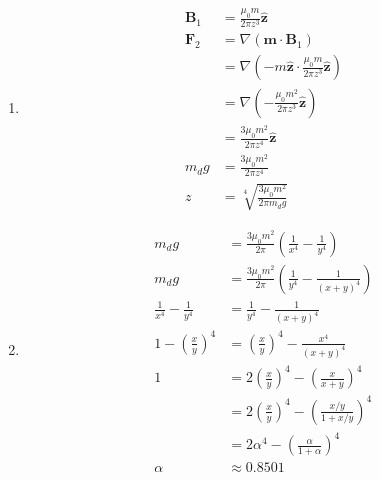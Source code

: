 \documentclass{article}
\renewcommand{\vec}[1]{\boldsymbol{\mathbf{#1}}}
\newcommand{\uvec}[1]{\hat{\vec{#1}}}
\begin{document}
\begin{enumerate}
  \item

        \begin{align*}
          \vec{B}_1 & = \frac{\mu_0 m}{2 \pi z^3} \uvec{z}                                         \\
          \vec{F}_2 & = \nabla (\vec{m} \cdot \vec{B}_1)                                           \\
                    & = \nabla \left( -m \uvec{z} \cdot \frac{\mu_0 m}{2 \pi z^3} \uvec{z} \right) \\
                    & = \nabla \left( -\frac{\mu_0 m^2}{2 \pi z^3} \uvec{z} \right)                \\
                    & = \frac{3 \mu_0 m^2}{2 \pi z^4} \uvec{z}                                     \\
          m_d g     & = \frac{3 \mu_0 m^2}{2 \pi z^4}                                              \\
          z         & = \sqrt[4]{\frac{3 \mu_0 m^2}{2 \pi m_d g}}
        \end{align*}

  \item

        \begin{align*}
          m_d g                            & = \frac{3 \mu_0 m^2}{2 \pi} \left( \frac{1}{x^4} - \frac{1}{y^4} \right)       \\
          m_d g                            & = \frac{3 \mu_0 m^2}{2 \pi} \left( \frac{1}{y^4} - \frac{1}{(x + y)^4} \right) \\
          \frac{1}{x^4} - \frac{1}{y^4}    & = \frac{1}{y^4} - \frac{1}{(x + y)^4}                                          \\
          1 - \left( \frac{x}{y} \right)^4 & = \left( \frac{x}{y} \right)^4 - \frac{x^4}{(x + y)^4}                         \\
          1                                & = 2 \left( \frac{x}{y} \right)^4 - \left( \frac{x}{x + y} \right)^4            \\
                                           & = 2 \left( \frac{x}{y} \right)^4 - \left( \frac{x / y}{1 + x / y} \right)^4    \\
                                           & = 2 \alpha^4 - \left( \frac{\alpha}{1 + \alpha} \right)^4                      \\
          \alpha                           & \approx 0.8501
        \end{align*}
\end{enumerate}
\end{document}
